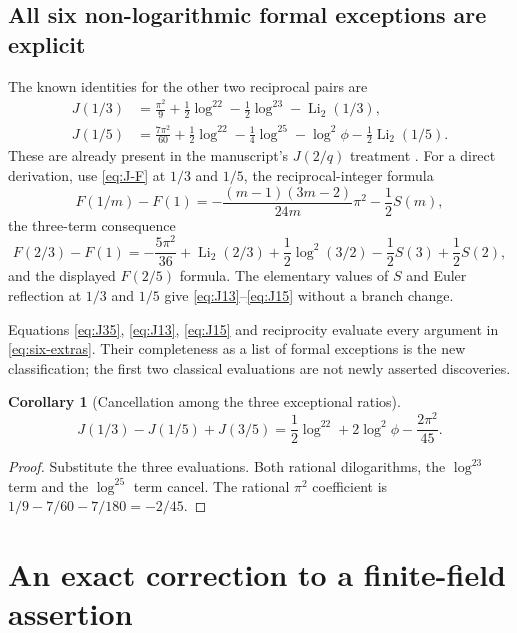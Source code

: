 \documentclass[11pt]{article}
\numberwithin{equation}{section}
\newtheorem{corollary}[theorem]{Corollary}
\theoremstyle{definition}
\theoremstyle{remark}
\DeclareMathOperator{\Li}{Li}
\begin{document}
\subsection{All six non-logarithmic formal exceptions are explicit}

The known identities for the other two reciprocal pairs are
\begin{align}
 J(1/3)&=\frac{\pi^2}{9}+\frac12\log^22-\frac12\log^23-\Li_2(1/3),
 \label{eq:J13}\\
 J(1/5)&=\frac{7\pi^2}{60}+\frac12\log^22-\frac14\log^25
                  -\log^2\phi-\frac12\Li_2(1/5).
 \label{eq:J15}
\end{align}
These are already present in the manuscript's $J(2/q)$ treatment
\cite{Repo}. For a direct derivation, use \eqref{eq:J-F} at $1/3$ and
$1/5$, the reciprocal-integer formula
\[
 F(1/m)-F(1)=-\frac{(m-1)(3m-2)}{24m}\pi^2-\frac12S(m),
\]
the three-term consequence
\[
 F(2/3)-F(1)=-\frac{5\pi^2}{36}+\Li_2(2/3)
                  +\frac12\log^2(3/2)-\frac12S(3)+\frac12S(2),
\]
and the displayed $F(2/5)$ formula. The elementary values of $S$ and
Euler reflection at $1/3$ and $1/5$ give
\eqref{eq:J13}--\eqref{eq:J15} without a branch change.

Equations \eqref{eq:J35}, \eqref{eq:J13}, \eqref{eq:J15} and
reciprocity evaluate every argument in \eqref{eq:six-extras}. Their
completeness as a list of formal exceptions is the new classification;
the first two classical evaluations are not newly asserted discoveries.

\begin{corollary}[Cancellation among the three exceptional ratios]
\label{cor:exceptional-relation}
\begin{equation}\label{eq:exceptional-relation}
 \boxed{\quad J(1/3)-J(1/5)+J(3/5)
      =\frac12\log^22+2\log^2\phi-\frac{2\pi^2}{45}.\quad}
\end{equation}
\end{corollary}
\begin{proof}
Substitute the three evaluations. Both rational dilogarithms, the
$\log^23$ term and the $\log^25$ term cancel. The rational
$\pi^2$ coefficient is $1/9-7/60-7/180=-2/45$.
\end{proof}


\section{An exact correction to a finite-field assertion}
\label{sec:audit}
\end{document}
